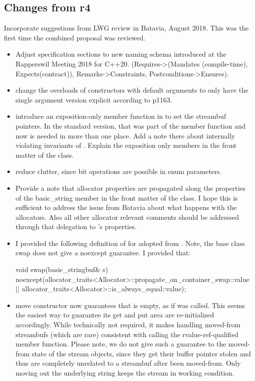 \documentclass[ebook,11pt,article]{memoir}
\begin{document}
\subsection{Changes from r4}
Incorporate suggestions from LWG review in Batavia, August 2018. This was the first time the combined proposal was reviewed.
\begin{itemize}
\item Adjust specification sections to new naming schema introduced at the Rapperswil Meeting 2018 for C++20. (Requires->(Mandates (compile-time), Expects(contract)), Remarks->Constraints, Postconditions->Ensures). 

\item change the overloads of constructors with default arguments to only have the single argument version explicit according to p1163.
\item introduce an exposition-only member function  in  to set the streambuf pointers. In the standard version, that was part of the  member function and now is needed in more than one place. Add a note there about internally violating invariants of . Explain the exposition only members in the front matter of the class.
\item reduce clutter, since bit operations are possible in enum  parameters.
\item Provide a note that allocator properties are propagated along the properties of the basic_string member  in the front matter of the class. I hope this is sufficient to address the issue from Batavia about what happens with the allocators. Also all other allocator relevant comments should be addressed through that delegation to 's properties.
\item I provided the following definition of  for  adopted from . Note, the base class swap does not give a noexcept guarantee. I provided that:
\begin{codeblock}
void swap(basic_stringbuf& s)
  noexcept(allocator_traits<Allocator>::propagate_on_container_swap::value ||
           allocator_traits<Allocator>::is_always_equal::value);
\end{codeblock}
\item {} move constructor now guarantees that  is empty, as if  was called. This seems the easiest way to guarantee its get and put area are re-initialized accordingly. While technically not required, it makes handling moved-from streambufs (which are rare) consistent with calling the rvalue-ref-qualified  member function. Please note, we do not give such a guarantee to the moved-from state of the stream objects, since they get their buffer pointer stolen and thus are completely unrelated to a streambuf after been moved-from. Only moving out the underlying string keeps the stream in working condition.
\end{itemize}
\end{document}
